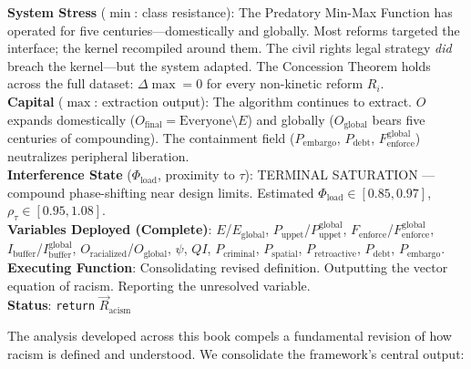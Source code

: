 \documentclass[12pt,openany]{book}
\begin{document}
\begin{tcolorbox}[colback=black!5, colframe=black!70, fonttitle=\bfseries\ttfamily, title=RUNTIME LOG: FINAL OUTPUT]
\ttfamily\small
\textbf{System Stress} ($\min$: class resistance): The Predatory Min-Max Function has operated for five centuries---domestically and globally. Most reforms targeted the interface; the kernel recompiled around them. The civil rights legal strategy \textit{did} breach the kernel---but the system adapted. The Concession Theorem holds across the full dataset: $\Delta\max = 0$ for every non-kinetic reform $R_i$.\\
\textbf{Capital} ($\max$: extraction output): The algorithm continues to extract. $O$ expands domestically ($O_{\text{final}} = \text{Everyone} \setminus E$) and globally ($O_{\text{global}}$ bears five centuries of compounding). The containment field ($P_{\text{embargo}}${,} $P_{\text{debt}}${,} $F_{\text{enforce}}^{\text{global}}$) neutralizes peripheral liberation.\\
\textbf{Interference State} ($\Phi_{\text{load}}$, proximity to $\tau$): TERMINAL SATURATION --- compound phase-shifting near design limits. Estimated $\Phi_{\text{load}} \in [0.85, 0.97]$, $\rho_{\tau} \in [0.95, 1.08]$.\\
\textbf{Variables Deployed (Complete)}: $E$/$E_{\text{global}}${,} $P_{\text{uppet}}$/$P_{\text{uppet}}^{\text{global}}${,} $F_{\text{enforce}}$/$F_{\text{enforce}}^{\text{global}}${,} $I_{\text{buffer}}$/$I_{\text{buffer}}^{\text{global}}${,} $O_{\text{racialized}}$/$O_{\text{global}}${,} $\psi${,} $QI${,} $P_{\text{criminal}}${,} $P_{\text{spatial}}${,} $P_{\text{retroactive}}${,} $P_{\text{debt}}${,} $P_{\text{embargo}}$.\\
\textbf{Executing Function}: Consolidating revised definition. Outputting the vector equation of racism. Reporting the unresolved variable.\\
\textbf{Status}: \texttt{return} $\vec{R}_{\text{acism}}$
\end{tcolorbox}

\medskip

The analysis developed across this book compels a fundamental revision of how racism is defined and understood. We consolidate the framework's central output:
\end{document}
